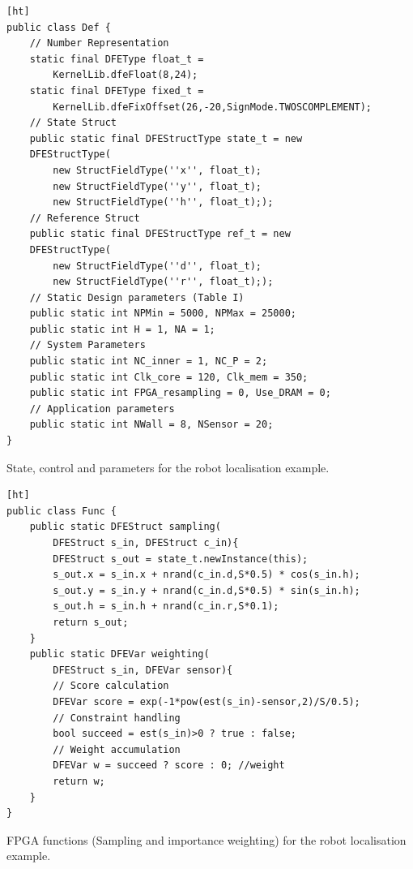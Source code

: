 \begin{Code}
    \centering
\lstset{language=Java,
        basicstyle=\ttfamily\small,
				tabsize=2,
				numbers=left,
				numberstyle=\tiny,
				frame=tb,
				columns=fullflexible,
				showstringspaces=false
				}
\begin{lstlisting}[][ht]
public class Def {
	// Number Representation
	static final DFEType float_t = 
		KernelLib.dfeFloat(8,24);
	static final DFEType fixed_t = 
		KernelLib.dfeFixOffset(26,-20,SignMode.TWOSCOMPLEMENT);
	// State Struct
	public static final DFEStructType state_t = new 
	DFEStructType(
		new StructFieldType(''x'', float_t);
		new StructFieldType(''y'', float_t);
		new StructFieldType(''h'', float_t););
	// Reference Struct
	public static final DFEStructType ref_t = new 
	DFEStructType(
		new StructFieldType(''d'', float_t);
		new StructFieldType(''r'', float_t););
	// Static Design parameters (Table I)
	public static int NPMin = 5000, NPMax = 25000;
	public static int H = 1, NA = 1;
	// System Parameters
	public static int NC_inner = 1, NC_P = 2;
	public static int Clk_core = 120, Clk_mem = 350;
	public static int FPGA_resampling = 0, Use_DRAM = 0;
	// Application parameters
	public static int NWall = 8, NSensor = 20;
}
\end{lstlisting}
\caption{State, control and parameters for the robot localisation example.}
\label{lst:def}
\end{Code}

\begin{Code}
\centering
\lstset{language=Java,
        basicstyle=\ttfamily\small,
				tabsize=2,
				numbers=left,
				numberstyle=\tiny,
				frame=tb,
				columns=fullflexible,
				showstringspaces=false
				}
\begin{lstlisting}[][ht]
public class Func {
	public static DFEStruct sampling(
		DFEStruct s_in, DFEStruct c_in){
		DFEStruct s_out = state_t.newInstance(this);
		s_out.x = s_in.x + nrand(c_in.d,S*0.5) * cos(s_in.h);
		s_out.y = s_in.y + nrand(c_in.d,S*0.5) * sin(s_in.h);
		s_out.h = s_in.h + nrand(c_in.r,S*0.1);
		return s_out;
	}
	public static DFEVar weighting(
		DFEStruct s_in, DFEVar sensor){
		// Score calculation
		DFEVar score = exp(-1*pow(est(s_in)-sensor,2)/S/0.5);
		// Constraint handling
		bool succeed = est(s_in)>0 ? true : false;
		// Weight accumulation
		DFEVar w = succeed ? score : 0; //weight
		return w;
	}
}
\end{lstlisting}
\caption{FPGA functions (Sampling and importance weighting) for the robot localisation example.}
\label{lst:func}
\end{Code}


